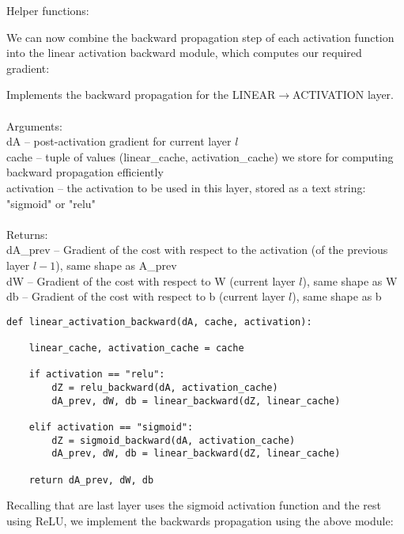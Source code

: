 \documentclass[a4paper]{article}
\begin{document}
Helper functions: 
\begin{alg}{}{}
\end{alg}

We can now combine the backward propagation step of each activation function into the linear activation backward module, which computes our required gradient: 

\begin{alg}{}{} Implements the backward propagation for the LINEAR$\to$ACTIVATION layer.\\~\\
Arguments: \\
dA -- post-activation gradient for current layer $l$ \\
cache -- tuple of values (linear\_cache, activation\_cache) we store for computing backward propagation efficiently\\
activation -- the activation to be used in this layer, stored as a text string: "sigmoid" or "relu"\\~\\
Returns: \\
dA\_prev -- Gradient of the cost with respect to the activation (of the previous layer $l-1$), same shape as A\_prev\\
dW -- Gradient of the cost with respect to W (current layer $l$), same shape as W\\
db -- Gradient of the cost with respect to b (current layer $l$), same shape as b\\
\begin{verbatim}
def linear_activation_backward(dA, cache, activation):

    linear_cache, activation_cache = cache
    
    if activation == "relu":
        dZ = relu_backward(dA, activation_cache)
        dA_prev, dW, db = linear_backward(dZ, linear_cache)
        
    elif activation == "sigmoid":
        dZ = sigmoid_backward(dA, activation_cache)
        dA_prev, dW, db = linear_backward(dZ, linear_cache)
    
    return dA_prev, dW, db
\end{verbatim}
\end{alg}

Recalling that are last layer uses the sigmoid activation function and the rest using ReLU, we implement the backwards propagation using the above module: 
\end{document}
